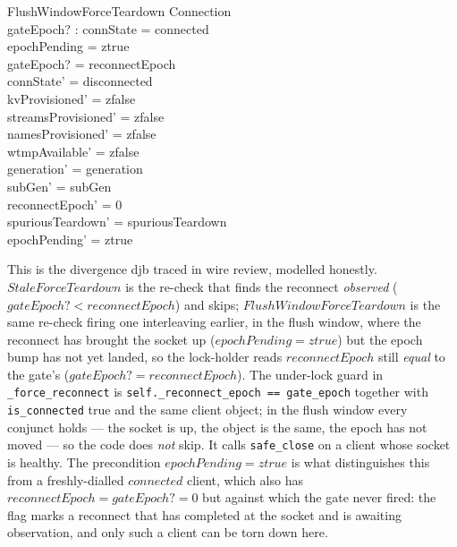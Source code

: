 \documentclass[a4paper,10pt,fleqn]{article}
\begin{document}
\begin{schema}{FlushWindowForceTeardown}
  \Delta Connection \\
  gateEpoch? : \nat
  \where
  connState = connected \\
  epochPending = ztrue \\
  gateEpoch? = reconnectEpoch \\
  connState' = disconnected \\
  kvProvisioned' = zfalse \\
  streamsProvisioned' = zfalse \\
  namesProvisioned' = zfalse \\
  wtmpAvailable' = zfalse \\
  generation' = generation \\
  subGen' = subGen \\
  reconnectEpoch' = 0 \\
  spuriousTeardown' = spuriousTeardown \\
  epochPending' = ztrue
\end{schema}

This is the divergence djb traced in wire review, modelled honestly.
$StaleForceTeardown$ is the re-check that finds the reconnect
\emph{observed} ($gateEpoch? < reconnectEpoch$) and skips;
$FlushWindowForceTeardown$ is the same re-check firing one interleaving
earlier, in the flush window, where the reconnect has brought the socket
up ($epochPending = ztrue$) but the epoch bump has not yet landed, so the
lock-holder reads $reconnectEpoch$ still \emph{equal} to the gate's
($gateEpoch? = reconnectEpoch$).  The under-lock guard in
\texttt{\_force\_reconnect} is \texttt{self.\_reconnect\_epoch ==
gate\_epoch} together with \texttt{is\_connected} true and the same
client object; in the flush window every conjunct holds --- the socket is
up, the object is the same, the epoch has not moved --- so the code does
\emph{not} skip.  It calls \texttt{safe\_close} on a client whose socket
is healthy.  The precondition $epochPending = ztrue$ is what distinguishes
this from a freshly-dialled $connected$ client, which also has
$reconnectEpoch = gateEpoch? = 0$ but against which the gate never fired:
the flag marks a reconnect that has completed at the socket and is
awaiting observation, and only such a client can be torn down here.
\end{document}
